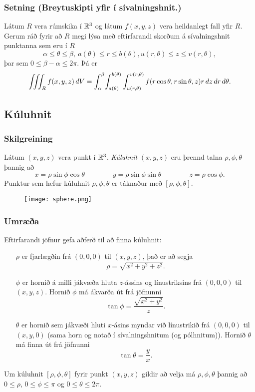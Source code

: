 \subsubsection{Setning (Breytuskipti yfir í sívalningshnit.)}

Látum $R$ vera rúmskika í ${\mathbb R}^3$ og látum $f(x,y,z)$ vera heildanlegt fall yfir $R$.  Gerum ráð fyrir að $R$ megi lýsa með eftirfarandi skorðum á sívalningshnit punktanna sem eru í $R$
$$\alpha\leq \theta\leq \beta,\ a(\theta)\leq r\leq  b(\theta), u(r,\theta)\leq z\leq v(r,\theta),$$ 
þar sem $0\leq \beta-\alpha\leq 2\pi$.  Þá er
$$\int\!\!\!\int\!\!\!\int_R f(x,y,z)\,dV= 
\int_\alpha^\beta
\!\int_{a(\theta)}^{b(\theta)}\int_{u(r,\theta)}^{v(r,\theta)}      
f(r\cos\theta,r\sin\theta,z)r\,dz\,dr\,d\theta.$$
 



\subsection{Kúluhnit} 

\subsubsection{Skilgreining }
 Látum $(x,y,z)$ vera punkt í ${\mathbb R}^3$.  {\em Kúluhnit} $(x,y,z)$ eru þrennd talna $\rho, \phi, \theta$ þannig að 
$$x=\rho\sin\phi\cos\theta\qquad\qquad y=\rho\sin\phi\sin\theta\qquad\qquad z=\rho\cos\phi.$$
Punktur sem hefur kúluhnit $\rho, \phi, \theta$ er táknaður 
með $[\rho, \phi, \theta]$. 

\begin {figure}[h!]
 \centering
            \texttt{[image: sphere.png]}
            \caption*{}
\end {figure}



\subsubsection{Umræða }
Eftirfarandi jöfnur gefa aðferð til að finna kúluhnit:
\begin{itemize}
\item[$\rho$]  er fjarlægðin frá $(0,0,0)$ til $(x,y,z)$, það er að segja 
$$\rho=\sqrt{x^2+y^2+z^2}.$$
\item[$\phi$] er hornið á milli jákvæða hluta $z$-ássins og línustriksins frá $(0,0,0)$ til $(x,y,z)$.  Hornið $\phi$ má ákvarða út frá jöfnunni
$$\tan\phi=\frac{\sqrt{x^2+y^2}}{z}.$$
\item[$\theta$] er hornið sem jákvæði hluti $x$-ásins myndar við línustrikið frá $(0,0,0)$ til $(x,y,0)$ (sama horn og notað í sívalningshnitum (og pólhnitum)).   Hornið $\theta$ má finna út frá jöfnunni
$$\tan\theta=\frac{y}{x}.$$
\end{itemize}
Um kúluhnit $[\rho, \phi, \theta]$ fyrir punkt $(x,y,z)$ gildir að 
velja má $\rho, \phi, \theta$ þannig að
$0\leq \rho$, $0\leq\phi\leq \pi$ og $0\leq\theta\leq 2\pi$.





